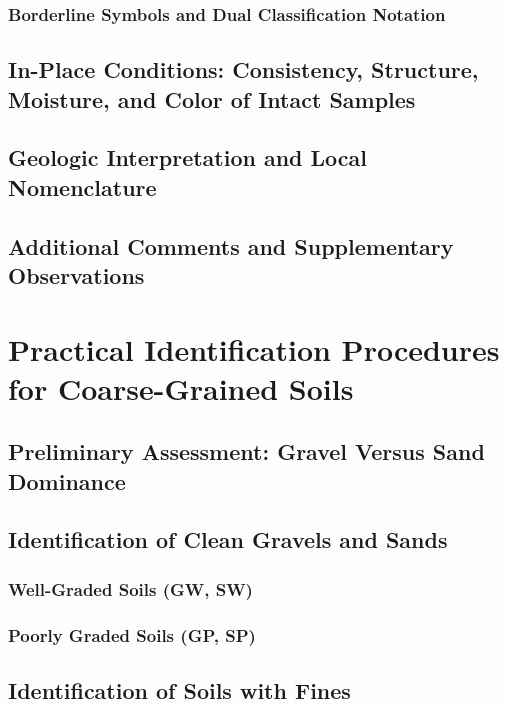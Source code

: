 \subsubsection{Borderline Symbols and Dual Classification Notation}

\subsection{In-Place Conditions: Consistency, Structure, Moisture, and Color of Intact Samples}

\subsection{Geologic Interpretation and Local Nomenclature}

\subsection{Additional Comments and Supplementary Observations}

\section{Practical Identification Procedures for Coarse-Grained Soils}

\subsection{Preliminary Assessment: Gravel Versus Sand Dominance}

\subsection{Identification of Clean Gravels and Sands}

\subsubsection{Well-Graded Soils (GW, SW)}

\subsubsection{Poorly Graded Soils (GP, SP)}

\subsection{Identification of Soils with Fines}

